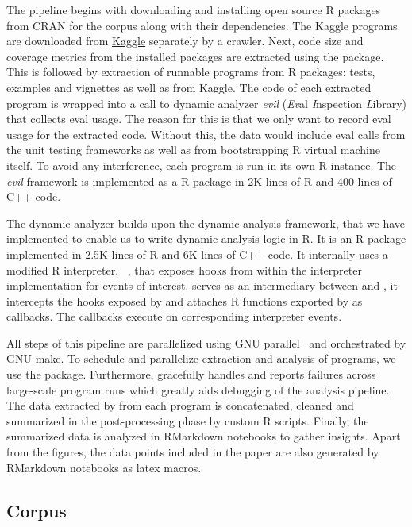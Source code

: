 \documentclass[USenglish,cleveref, autoref, thm-restate]{lipics-v2019}
\begin{document}
The pipeline begins with downloading and installing open source R packages
from CRAN for the corpus along with their dependencies. The Kaggle programs
are downloaded from \href{http://www.kaggle.com}{Kaggle} separately by a
crawler.  Next, code size and coverage metrics from the installed packages
are extracted using the \href{ https://github.com/r-lib/covr}{\covr}
package. This is followed by extraction of runnable programs from R
packages: tests, examples and vignettes as well as from Kaggle. The code of
each extracted program is wrapped into a call to dynamic analyzer
\emph{evil} (\emph{Ev}al \emph{I}nspection \emph{L}ibrary) that collects eval
usage. The reason for this is that we only want to record eval usage for the
extracted code. Without this, the data would include eval calls from the
unit testing frameworks as well as from bootstrapping R virtual machine
itself. To avoid any interference, each program is run in its own R
instance. The \emph{evil} framework is implemented as a R package in 2K lines of
R and 400 lines of C++ code.

The dynamic analyzer builds upon the dynamic analysis framework, \instrumentr
that we have implemented to enable us to write dynamic analysis logic in R. It
is an R package implemented in 2.5K lines of R and 6K lines of C++ code. It
internally uses a modified R interpreter, \rdyntrace~\cite{oopsla19a}, that
exposes hooks from within the interpreter implementation for events of interest.
\instrumentr serves as an intermediary between \rdyntrace and \evil, it
intercepts the hooks exposed by \rdyntrace and attaches R functions exported by
\evil as callbacks. The \evil callbacks execute on corresponding interpreter
events.

All steps of this pipeline are parallelized using GNU
parallel~\cite{GNUparallel} and orchestrated by GNU make. To schedule and
parallelize extraction and analysis of programs, we use the \runr
package. Furthermore, \runr gracefully handles and reports failures across
large-scale program runs which greatly aids debugging of the analysis
pipeline.  The data extracted by \evil from each program is concatenated,
cleaned and summarized in the post-processing phase by custom R
scripts. Finally, the summarized data is analyzed in RMarkdown notebooks to
gather insights. Apart from the figures, the data points included in the
paper are also generated by RMarkdown notebooks as latex macros.

\subsection{Corpus}
\end{document}
